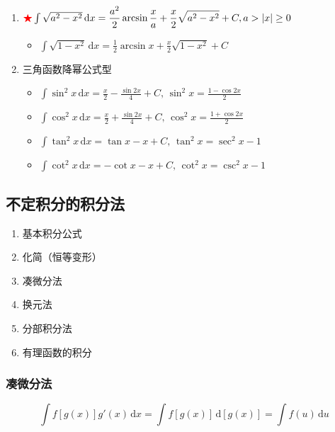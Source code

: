 \documentclass[a4paper,12pt]{article}
\begin{document}
\begin{enumerate}
\begin{itemize}
        \end{itemize}
        \item ${\color{red}{\bigstar}}\int \sqrt {a^2 - x^2}\,\mathrm{d}x = \displaystyle\frac{a^2}{2} \arcsin \displaystyle\frac{x}{a} + \displaystyle\frac{x}{2}\sqrt {a^2 - x^2} + C, a > |x| \geq 0$
        \begin{itemize}
            \item $\int \sqrt {1 - x^2}\,\mathrm{d}x = \displaystyle\frac{1}{2} \arcsin x + \displaystyle\frac{x}{2}\sqrt {1 - x^2} + C$
        \end{itemize}
        \item 三角函数降幂公式型
        \begin{itemize}
            \item $\int \sin^2 x\,\mathrm{d}x = \displaystyle\frac{x}{2} - \displaystyle\frac{\sin 2x}{4} + C, \,\sin^2 x = \displaystyle\frac{1-\cos 2x}{2}$
            \item $\int \cos^2 x\,\mathrm{d}x = \displaystyle\frac{x}{2} + \displaystyle\frac{\sin 2x}{4} + C, \,\cos^2 x = \displaystyle\frac{1+\cos 2x}{2}$
            \item $\int \tan^2 x\,\mathrm{d}x = \tan x - x + C, \,\tan^2 x = \sec^2 x - 1$
            \item $\int \cot^2 x\,\mathrm{d}x = -\cot x - x + C, \,\cot^2 x = \csc^2 x - 1$
        \end{itemize}
    \end{enumerate}

    \subsection{不定积分的积分法}

    \begin{enumerate}
        \item 基本积分公式
        \item 化简（恒等变形）
        \item 凑微分法
        \item 换元法
        \item 分部积分法
        \item 有理函数的积分
    \end{enumerate}

    \subsubsection{凑微分法}

    \[
        \int f[g(x)]g'(x)\,\mathrm{d}x = \int f[g(x)]\,\mathrm{d}[g(x)] = \int f(u)\,\mathrm{d}u
    \]
\end{document}
